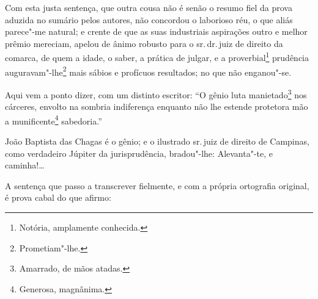 \asterisc

Com esta justa sentença, que outra cousa não é senão o resumo fiel da
prova aduzida no sumário pelos autores, não concordou o laborioso réu, o
que aliás parece"-me natural; e crente de que as suas industriais
aspirações outro e melhor prêmio mereciam, apelou de ânimo robusto para
o sr.\,dr.\,juiz de direito da comarca, de quem a idade, o saber, a
prática de julgar, e a proverbial\footnote{Notória, amplamente
  conhecida.} prudência auguravam"-lhe\footnote{Prometiam"-lhe.} mais
sábios e profícuos resultados; no que não enganou"-se.

Aqui vem a ponto dizer, com um distinto escritor: ``O gênio luta
manietado\footnote{Amarrado, de mãos atadas.} nos cárceres, envolto na
sombria indiferença enquanto não lhe estende protetora mão a
munificente\footnote{Generosa, magnânima.} sabedoria.''

João Baptista das Chagas é o gênio; e o ilustrado sr.\,juiz de direito de
Campinas, como verdadeiro Júpiter da jurisprudência, bradou"-lhe:
Alevanta"-te, e caminha!\ldots{}

A sentença que passo a transcrever fielmente, e com a própria ortografia
original, é prova cabal do que afirmo:


